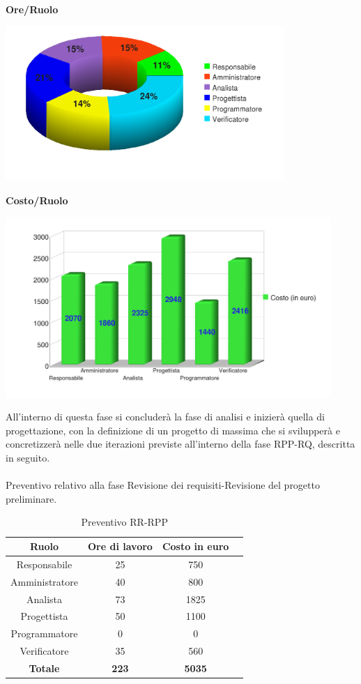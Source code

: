 \newpage
\begin{center}\textbf{Ore/Ruolo}
\end{center}
\includegraphics[width=300pt]{OreTotali}

\begin{center}\textbf{Costo/Ruolo}
\end{center}
\includegraphics[width=350pt]{CostiTotali}

All'interno di questa fase si concluder\`a la fase di analisi e inizier\`a quella di progettazione, con la definizione di un progetto di massima che si svilupper\`a e concretizzer\`a nelle due iterazioni previste all'interno della fase RPP-RQ, descritta in seguito. \\
\\
Preventivo relativo alla fase Revisione dei requisiti-Revisione del progetto preliminare.
\begin{table}[h]
	\begin{center}
		  \begin{tabular}{|c|c|c|c|}
		 \hline 
		 \textbf{Ruolo} & \textbf{Ore di lavoro} & \textbf{Costo in euro}\\
		 \hline
		Responsabile & 25 & 750 \\
		Amministratore & 40 & 800\\
		Analista & 73 & 1825\\
		Progettista & 50 & 1100\\
		Programmatore & 0 & 0 \\
		Verificatore & 35 & 560\\
        \hline
        \textbf{Totale} & \textbf{223} & \textbf{5035}\\
		\hline
		\end{tabular}
	\caption{Preventivo RR-RPP} 
	\label{tab:tabella_RR-RPP}
	\end{center}	
\end{table}

